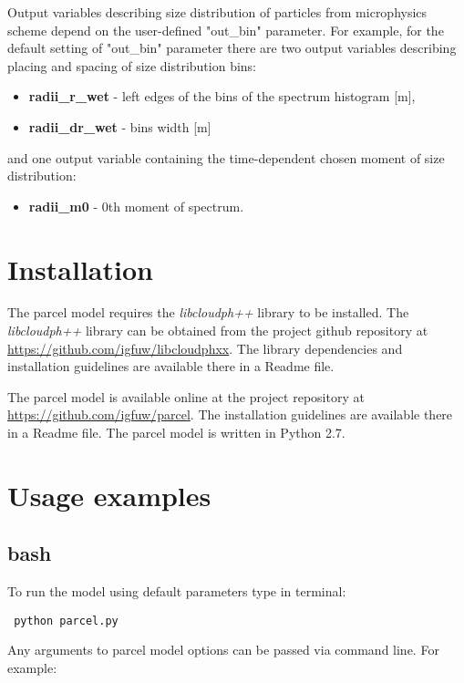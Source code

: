 \documentclass[11pt]{article}
\newcommand{\prog}[1]{{\tt#1}}
\begin{document}
\noindent
Output variables describing size distribution of particles from microphysics scheme depend 
  on the user-defined "out\_bin" parameter.
For example, for the default setting of "out\_bin" parameter there are two output variables 
  describing placing and spacing of size distribution bins:

\begin{itemize}
  \item \textbf{radii\_r\_wet} - left edges of the bins of the spectrum histogram [m],
  \item \textbf{radii\_dr\_wet} - bins width [m]
\end{itemize}

and one output variable containing the time-dependent chosen moment of size distribution:
\begin{itemize}
  \item \textbf{radii\_m0} - 0th moment of spectrum.
\end{itemize}

\section{Installation}

The parcel model requires the \emph{libcloudph++} library to be installed. 
The \emph{libcloudph++} library can be obtained from the project github repository 
  at \url{https://github.com/igfuw/libcloudphxx}.
The library dependencies and installation guidelines are available there in a Readme file.

The parcel model is available online at the project repository at \url{https://github.com/igfuw/parcel}.
The installation guidelines are available there in a Readme file.
The parcel model is written in Python 2.7.

\section{Usage examples}

\subsection{bash}

\noindent
To run the model using default parameters type in terminal:

\vspace{0.35cm}
  \prog{ python parcel.py}
\vspace{0.35cm}

\noindent
Any arguments to parcel model options can be passed via command line. For example:
\end{document}
